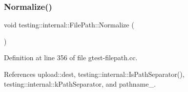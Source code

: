 \subsubsection{\texorpdfstring{Normalize()}{Normalize()}}
{\footnotesize\ttfamily void testing\+::internal\+::\+File\+Path\+::\+Normalize (\begin{DoxyParamCaption}{ }\end{DoxyParamCaption})\hspace{0.3cm}{\ttfamily [private]}}



Definition at line 356 of file gtest-\/filepath.\+cc.



References upload\+::dest, testing\+::internal\+::\+Is\+Path\+Separator(), testing\+::internal\+::k\+Path\+Separator, and pathname\+\_\+.


